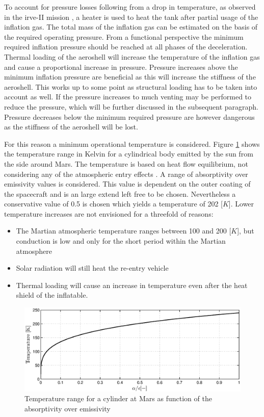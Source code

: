 To account for pressure losses following from a drop in temperature, as observed in the \gls{irve}-II mission \cite{Dillman2012}, a heater is used to heat the tank after partial usage of the inflation gas. The total mass of the inflation gas can be estimated on the basis of the required operating pressure. From a functional perspective the minimum required inflation pressure should be reached at all phases of the deceleration. Thermal loading of the aeroshell will increase the temperature of the inflation gas and cause a proportional increase in pressure. Pressure increases above the minimum inflation pressure are beneficial as this will increase the stiffness of the aeroshell. This works up to some point as structural loading has to be taken into account as well. If the pressure increases to much venting may be performed to reduce the pressure, which will be further discussed in the subsequent paragraph. Pressure decreases below the minimum required pressure are however dangerous as the stiffness of the aeroshell will be lost.

For this reason a minimum operational temperature is considered. Figure \ref{fig:tanktemp} shows the temperature range in Kelvin for a cylindrical body emitted by the sun from the side around Mars. The temperature is based on heat flow equilibrium, not considering any of the atmospheric entry effects \cite{Wertz2011}. A range of absorptivity over emissivity values is considered. This value is dependent on the outer coating of the spacecraft and is an large extend left free to be chosen. Nevertheless a conservative value of 0.5 is chosen which yields a temperature of 202 [$K$]. Lower temperature increases are not envisioned for a threefold of reasons:

\begin{itemize}
\item The Martian atmospheric temperature ranges between 100 and 200 [$K$], but conduction is low and only for the short period within the Martian atmosphere
\item Solar radiation will still heat the re-entry vehicle
\item Thermal loading will cause an increase in temperature even after the heat shield of the inflatable.
\end{itemize}

\begin{figure}[h]
		\centering
		\includegraphics[width=1.0\textwidth]{./Figure/Structure/tanktemperature.eps}
		\caption{Temperature range for a cylinder at Mars as function of the absorptivity over emissivity}
		\label{fig:tanktemp}
\end{figure}

